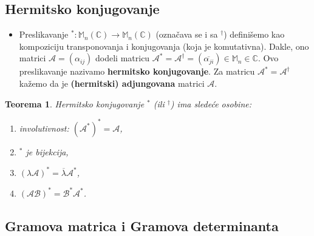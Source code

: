 \documentclass[a4paper,12pt,twoside]{report}
\newtheorem{theorem}{Teorema}[section]
\numberwithin{algorithm}{section}
\begin{document}
\subsection{Hermitsko konjugovanje}

\begin{itemize}
    \item Preslikavanje $^*: \mathbb{M}_n(\mathbb{C}) \to \mathbb{M}_n(\mathbb{C})$ (označava se i sa $^\dagger$) definišemo
    kao kompoziciju transponovanja i konjugovanja (koja je komutativna). Dakle, ono matrici \linebreak $\mathcal{A} = (\alpha_{ij})$ 
    dodeli matricu $\mathcal{A}^* = \mathcal{A}^\dagger = (\overline{\alpha_{ji}}) \in \mathbb{M}_n \in \mathbb{C}$. Ovo preslikavanje
    nazivamo \textbf{hermitsko konjugovanje}. Za matricu $\mathcal{A}^* = \mathcal{A}^\dagger$ kažemo da je \textbf{(hermitski)
    adjungovana} matrici $\mathcal{A}$.
\end{itemize}

\begin{theorem}
    Hermitsko konjugovanje $^*$ (ili $^\dagger$) ima sledeće osobine:
    \begin{enumerate}
        \item involutivnost: $(\mathcal{A}^*)^* = \mathcal{A}$,
        \item $^*$ je bijekcija,
        \item $(\lambda \mathcal{A})^* = \overline{\lambda}\mathcal{A}^*$,
        \item $(\mathcal{AB})^* = \mathcal{B}^* \mathcal{A}^*$.
    \end{enumerate}
\end{theorem}

\subsection{Gramova matrica i Gramova determinanta}
\end{document}
